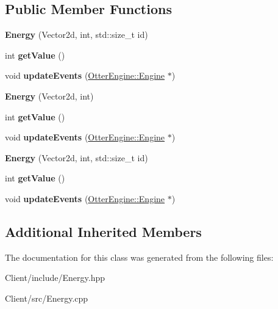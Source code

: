 \subsection*{Public Member Functions}
\begin{DoxyCompactItemize}
\item 
{\bfseries Energy} (Vector2d, int, std\+::size\+\_\+t id)\hypertarget{class_energy_a7a1bad25c5650e97da292edffeb2803d}{}\label{class_energy_a7a1bad25c5650e97da292edffeb2803d}

\item 
int {\bfseries get\+Value} ()\hypertarget{class_energy_ac3b956cbe8175ed67b900b51b17f8463}{}\label{class_energy_ac3b956cbe8175ed67b900b51b17f8463}

\item 
void {\bfseries update\+Events} (\hyperlink{class_otter_engine_1_1_engine}{Otter\+Engine\+::\+Engine} $\ast$)\hypertarget{class_energy_adc3b1a1652886da3d6bd9b95d42ef6f5}{}\label{class_energy_adc3b1a1652886da3d6bd9b95d42ef6f5}

\item 
{\bfseries Energy} (Vector2d, int)\hypertarget{class_energy_adba208801d84f475dd83176d94f9aa31}{}\label{class_energy_adba208801d84f475dd83176d94f9aa31}

\item 
int {\bfseries get\+Value} ()\hypertarget{class_energy_ac3b956cbe8175ed67b900b51b17f8463}{}\label{class_energy_ac3b956cbe8175ed67b900b51b17f8463}

\item 
void {\bfseries update\+Events} (\hyperlink{class_otter_engine_1_1_engine}{Otter\+Engine\+::\+Engine} $\ast$)\hypertarget{class_energy_adc3b1a1652886da3d6bd9b95d42ef6f5}{}\label{class_energy_adc3b1a1652886da3d6bd9b95d42ef6f5}

\item 
{\bfseries Energy} (Vector2d, int, std\+::size\+\_\+t id)\hypertarget{class_energy_a7a1bad25c5650e97da292edffeb2803d}{}\label{class_energy_a7a1bad25c5650e97da292edffeb2803d}

\item 
int {\bfseries get\+Value} ()\hypertarget{class_energy_ac3b956cbe8175ed67b900b51b17f8463}{}\label{class_energy_ac3b956cbe8175ed67b900b51b17f8463}

\item 
void {\bfseries update\+Events} (\hyperlink{class_otter_engine_1_1_engine}{Otter\+Engine\+::\+Engine} $\ast$)\hypertarget{class_energy_adc3b1a1652886da3d6bd9b95d42ef6f5}{}\label{class_energy_adc3b1a1652886da3d6bd9b95d42ef6f5}

\end{DoxyCompactItemize}
\subsection*{Additional Inherited Members}


The documentation for this class was generated from the following files\+:\begin{DoxyCompactItemize}
\item 
Client/include/Energy.\+hpp\item 
Client/src/Energy.\+cpp\end{DoxyCompactItemize}

